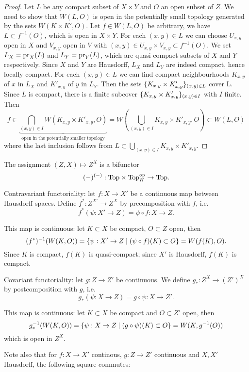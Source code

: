 \begin{proof}
Let $L$ be any compact subset of $X\times Y$ and $O$ an open subset of $Z$. We need to show that $W(L,O)$ is open in the potentially small topology generated by the sets $W(K\times K',O)$. Let $f\in W(L,O)$ be arbitrary, we have $L\subset f^{-1}(O)$, which is open in $X\times Y$. For each $(x,y)\in L$ we can choose $U_{x,y}$ open in $X$ and $V_{x,y}$ open in $V$ with $(x,y)\in U_{x,y}\times V_{x,y}\subset f^{-1}(O)$. We set $L_X=\operatorname{pr}_X(L)$ and $L_Y=\operatorname{pr}_Y(L)$, which are quasi-compact subsets of $X$ and $Y$ respectively. Since $X$ and $Y$ are Hausdorff, $L_X$ and $L_Y$ are indeed compact, hence locally compact. For each $(x,y)\in L$ we can find compact neighbourhoods $K_{x,y}$ of $x$ in $L_X$ and $K'_{x,y}$ of $y$ in $L_Y$. Then the sets $\{K_{x,y}\times K'_{x,y}\}_{(x,y)\in L}$ cover L. Since $L$ is compact, there is a finite subcover $\{K_{x,y}\times K'_{x,y}\}_{(x,y)\in I}$ with $I$ finite. Then
\[f\in\underbrace{\bigcap_{(x,y)\in I}W(K_{x,y}\times K'_{x,y},O)}_{\text{open in the potentially smaller topology}}=W(\bigcup_{(x,y)\in I}K_{x,y}\times K'_{x,y},O)\subset W(L,O)\]
where the last inclusion follows from $L\subset \bigcup_{(x,y)\in I}K_{x,y}\times K'_{x,y}$.
\end{proof}

\begin{remark}
The assignment $(Z,X)\mapsto Z^X$ is a bifunctor
\[(-)^{(-)}:{\mathrm{Top}}\times{\mathrm{Top}}^{\operatorname{op}}_{H}\to {\mathrm{Top}}.\]

Contravariant functoriality: let $f:X\to X'$ be a continuous map between Hausdorff spaces. Define $f^*:Z^{X'}\to Z^X$ by precomposition with $f$, i.e.
\[f^*(\psi:X'\to Z)=\psi\circ f:X\to Z.\]

This map is continuous: let $K\subset X$ be compact, $O\subset Z$ open, then
\[(f^*)^{-1}(W(K,O))=\{\psi:X'\to Z\mid (\psi\circ f)(K)\subset O\}=W(f(K),O).\]
Since $K$ is compact, $f(K)$ is quasi-compact; since $X'$ is Hausdorff, $f(K)$ is compact.

Covariant functoriality: let $g:Z\to Z'$ be continuous. We define $g_*:Z^X\to (Z')^X$ by postcomposition with $g$, i.e.
\[g_*(\psi:X\to Z)=g\circ\psi:X\to Z'.\]

This map is continuous: let $K\subset X$ be compact and $O\subset Z'$ open, then
\[g_*^{-1}(W(K,O))=\{\psi:X\to Z\mid (g\circ\psi)(K)\subset O\}=W(K,g^{-1}(O))\]
which is open in $Z^X$.

Note also that for $f:X\to X'$ continous, $g:Z\to Z'$ continuous and $X,X'$ Hausdorff, the following square commutes:
\begin{center}
\end{center}
\end{remark}

